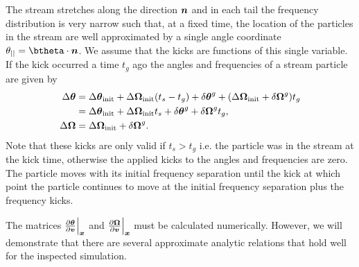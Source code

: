 \documentclass[useAMS,usenatbib,fleqn,a4paper]{mn2e}
\newcommand{\bs}[1]{\bmath{#1}}
\begin{document}
The stream stretches along the direction $\bs{n}$ and in each tail the frequency distribution is very narrow such that, at a fixed time, the location of the particles in the stream are well approximated by a single angle coordinate $\theta_{||}=\btheta\cdot\bs{n}$. We assume that the kicks are functions of this single variable. If the kick occurred a time $t_g$ ago the angles and frequencies of a stream particle are given by
\begin{equation}
\begin{split}
\Delta\bs{\theta} &= \Delta\bs{\theta}_{\rm init}+\Delta\boldsymbol{\Omega}_{\rm init}(t_s-t_g)+\delta\bs{\theta}^g+(\Delta\boldsymbol{\Omega}_{\rm init}+\delta\boldsymbol{\Omega}^g)t_g \\&= \Delta\bs{\theta}_{\rm init}+\Delta\boldsymbol{\Omega}_{\rm init}t_s+\delta\bs{\theta}^g+\delta\boldsymbol{\Omega}^g t_g,\\
\Delta\boldsymbol{\Omega} &= \Delta\boldsymbol{\Omega}_{\rm init}+\delta\boldsymbol{\Omega}^g.
\end{split}
\end{equation}
Note that these kicks are only valid if $t_s>t_g$ i.e. the particle was in the stream at the kick time, otherwise the applied kicks to the angles and frequencies are zero.
The particle moves with its initial frequency separation until the kick at which point the particle continues to move at the initial frequency separation plus the frequency kicks.

The matrices $\frac{\upartial \bs{\theta}}{\upartial \bs{v}}\Big|_{\bs{x}}$ and $\frac{\upartial \bs{\Omega}}{\upartial \bs{v}}\Big|_{\bs{x}}$ must be calculated numerically. However, we will demonstrate that there are several approximate analytic relations that hold well for the inspected simulation.
\end{document}
